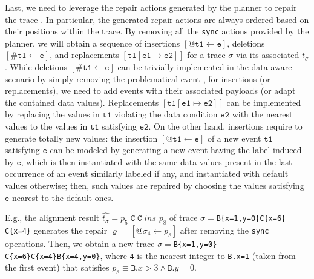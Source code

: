 Last, we need to leverage the repair actions generated by the planner to repair the  trace . In particular, the generated repair actions are always ordered based on their positions within the trace. By removing all the \texttt{sync} actions provided by the planner, we will obtain a sequence of insertions $[@\texttt{t1}\leftarrow \texttt{e}]$, deletions $[\#\texttt{t1}\leftarrow \texttt{e}]$, and replacements $[\texttt{t1}[ \texttt{e1}\mapsto  \texttt{e2}]]$ for a trace $\sigma$ via its associated $t_\sigma$. While deletions $[\#\texttt{t1}\leftarrow \texttt{e}]$ can be trivially implemented in the data-aware scenario by simply removing the problematical event , for insertions (or replacements), we need to add events with their associated payloads (or adapt the contained data values). Replacements $[\texttt{t1}[\texttt{e1}\mapsto  \texttt{e2}]]$ can be implemented by replacing the values in $\texttt{t1}$ violating the data condition $\texttt{e2}$ with the nearest values to the values in $\texttt{t1}$ satisfying $\texttt{e2}$. On the other hand, insertions require to generate totally new values: the insertion $[@\texttt{t1}\leftarrow \texttt{e}]$ of a new event $\texttt{t1}$ satisfying $\texttt{e}$ can be modeled by generating a new event having the label induced by $\texttt{e}$, which is then instantiated with the same data values present in the last occurrence of an event similarly labeled if any, and instantiated with default values otherwise; then, such values are repaired by choosing the values satisfying $\texttt{e}$ nearest to the default ones.

E.g., the alignment result $\hat{t_\sigma}=p_5\;\texttt{C}\;\texttt{C}\;\textit{ins\_}p_8$ of trace $\sigma=$\texttt{B\{x=1,y=0\}C\{x=6\}\\C\{x=4\}} generates the repair $\varrho=[@\sigma_4\leftarrow p_8]$ after removing the \texttt{sync} operations. Then, we obtain a new trace $\sigma=$\texttt{B\{x=1,y=0\}$  $C\{x=6\}C\{x=4\}B\{x=4,y=0\}}, where \texttt{4} is the nearest integer to \texttt{B.x=1} (taken from the first event) that satisfies $p_8\equiv\texttt{B}.x>3\wedge \texttt{B}.y=0$. 